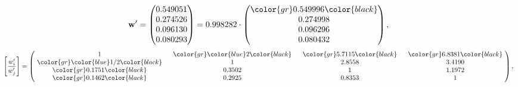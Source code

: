 \begin{example}
\begin{equation*}
\mathbf{w}^{\prime} =
\begin{pmatrix}
0.549051\\
0.274526\\
0.096130\\
0.080293
\end{pmatrix} =
0.998282\cdot
\begin{pmatrix}
\color{gr} 0.549996\color{black} \\
0.274998\\
0.096296\\
0.080432
\end{pmatrix},
\end{equation*}
\begin{equation*}
\left[ \frac{{w}^{\prime}_i}{{w}^{\prime}_j} \right] =
\begin{pmatrix}
$\,\,$ 1 $\,\,$ & $\,\,$\color{gr} \color{blue} 2\color{black} $\,\,$ & $\,\,$\color{gr} 5.7115\color{black} $\,\,$ & $\,\,$\color{gr} 6.8381\color{black} $\,\,$ \\
$\,\,$\color{gr} \color{blue}  1/2\color{black} $\,\,$ & $\,\,$ 1 $\,\,$ & $\,\,$2.8558$\,\,$ & $\,\,$3.4190  $\,\,$ \\
$\,\,$\color{gr} 0.1751\color{black} $\,\,$ & $\,\,$0.3502$\,\,$ & $\,\,$ 1 $\,\,$ & $\,\,$1.1972 $\,\,$ \\
$\,\,$\color{gr} 0.1462\color{black} $\,\,$ & $\,\,$0.2925$\,\,$ & $\,\,$0.8353$\,\,$ & $\,\,$ 1  $\,\,$ \\
\end{pmatrix},
\end{equation*}
\end{example}
\newpage

